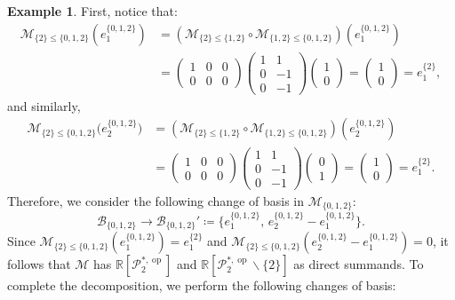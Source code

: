 \documentclass[reqno,12pt]{amsart}
\newcommand{\cM}{\mathcal{M}}
\newcommand{\cP}{\mathcal{P}}
\DeclareMathOperator{\op}{op}
\newcommand{\0}{\mathbf 0}
\theoremstyle{definition}
\newtheorem{example}[theorem]{Example}
\begin{document}
\begin{example}
    First, notice that: 
    \begin{align*}
        \cM_{\{2\}\leq\{0,1,2\}}(e_1^{\{0,1,2\}}) &= \left(\cM_{\{2\}\leq\{1,2\}}\circ \cM_{\{1,2\}\leq\{0,1,2\}}\right)(e_1^{\{0,1,2\}}) \\[1.5ex] 
        &=\begin{pmatrix} 
            1 & 0 & 0 \\ 0 & 0 & 0 
        \end{pmatrix} \begin{pmatrix} 
            1 & 1 \\ 0 & -1 \\ 0 & -1 
        \end{pmatrix} \begin{pmatrix}
            1\\ 0 
        \end{pmatrix} = \begin{pmatrix}
            1 \\ 0 
        \end{pmatrix} = e_1^{\{2\}},
    \end{align*}
    and similarly,
    \begin{align*}
        \cM_{\{2\}\leq\{0,1,2\}}\big(e_2^{\{0,1,2\}}\big) &= \left(\cM_{\{2\}\leq\{1,2\}}\circ \cM_{\{1,2\}\leq\{0,1,2\}}\right)(e_2^{\{0,1,2\}}) \\[1.5ex] 
        &=\begin{pmatrix} 
            1 & 0 & 0 \\ 0 & 0 & 0 
        \end{pmatrix} \begin{pmatrix} 
            1 & 1 \\ 0 & -1 \\ 0 & -1 
        \end{pmatrix} \begin{pmatrix}
            0\\ 1 
        \end{pmatrix} = \begin{pmatrix}
            1 \\ 0 
        \end{pmatrix} = e_1^{\{2\}}.
    \end{align*}
    Therefore, we consider the following change of basis in $\cM_{\{0,1,2\}}$:
    \[
        \mathcal{B}_{\{0,1,2\}}\longrightarrow \mathcal{B}_{\{0,1,2\}}'\coloneqq \{e_1^{\{0,1,2\}},\,e_2^{\{0,1,2\}}-e_1^{\{0,1,2\}}\}.
    \]
    Since $\cM_{\{2\}\leq \{0,1,2\}}(e_{1}^{\{0,1,2\}})=e_{1}^{\{2\}}$ and $\cM_{\{2\}\leq \{0,1,2\}}(e_{2}^{\{0,1,2\}}-e_{1}^{\{0,1,2\}})=0$, it follows that $\cM$ has $\mathbb{R}[\cP^{*,\op}_2]$ and $\mathbb{R}[\cP^{*,\op}_2\smallsetminus\{2\}]$ as direct summands. To complete the decomposition, we perform the following changes of basis:

\end{example}
\end{document}
